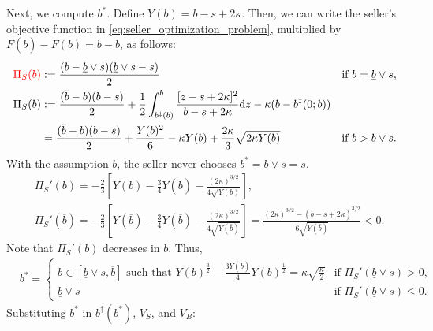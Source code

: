 Next, we compute $b^*$. Define $Y(b)=b-s+2\kappa$. Then, we can write the seller's objective function in \eqref{eq:seller_optimization_problem}, multiplied by $F(\overline b)-F(\underline b)=\overline b-\underline b$, as follows: 
    \begin{align*}
    \color{red} \Pi_S(b)&:= \frac{(\overline b-\underline b\vee s)(\underline b\vee s-s)}{2} & \text{if $b=\underline b\vee s$,}
    \\
    \Pi_S(b)&:= \frac{(\overline b-b)(b-s)}{2} 
    + \frac{1}{2}\int_{b^\ddagger(b)}^b \frac{[z-s+2\kappa]^2}{{b}-s+2\kappa}\text{d}z
    -\kappa(b-b^\ddagger(0;b))
    \\
    &=
    \frac{(\overline b-b)(b-s)}{2} + \frac{Y(b)^2}{6} - \kappa Y(b) + \frac{2\kappa}{3} \sqrt{2\kappa Y(b)} & \text{if $b>\underline b\vee s$.}
    \end{align*}
With the assumption $\underline b$, the seller never chooses $b^*=\underline b\vee s=s$. 
    \begin{align*}
    &\Pi_S'(b)
    =-\frac{2}{3} \left[Y(b)-\frac{3}{4}Y(\overline b) -\frac{(2\kappa)^{3/2}}{4\sqrt{Y(b)}}\right],
    \\
    &\Pi_S'(\overline b) 
    = -\frac{2}{3} \left[Y(\overline b)-\frac{3}{4}Y(\overline b) -\frac{(2\kappa)^{3/2}}{4\sqrt{Y(\overline b)}}\right]
    =\frac{(2\kappa)^{3/2}-(\bar b - s +2\kappa)^{3/2}}{6\sqrt{Y(\bar b)}}<0.
    \end{align*}
Note that $\Pi_S'(b)$ decreases in $b$. Thus, 
    \begin{align*}
    &b^* = \left\{
    \begin{array}{cl}
    \text{$b\in [\underline b\vee s,\overline b]$ such that $\displaystyle Y(b)^{\frac{3}{2}}-\frac{3Y(\overline b)}{4}  Y(b)^{\frac{1}{2}} = \kappa\sqrt{\frac{\kappa}{2}}$} & \text{if $\Pi_S'(\underline b\vee s) > 0$,} 
    \\[10pt]
    \underline b\vee s & \text{if $\Pi_S'(\underline b\vee s) \leq 0$.} 
    \end{array}
    \right.
    \end{align*}
Substituting $b^*$ in  $b^\ddagger(b^*)$, $V_S$, and $V_B$:
